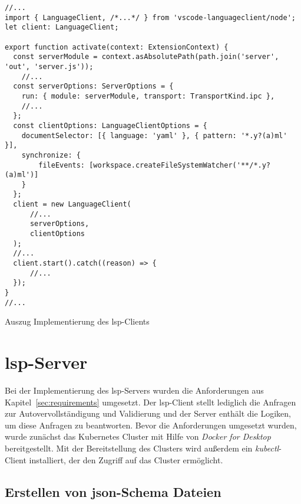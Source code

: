 \begin{listing}[htp]
  \begin{verbatim}
//...
import { LanguageClient, /*...*/ } from 'vscode-languageclient/node';
let client: LanguageClient;
      
export function activate(context: ExtensionContext) {
  const serverModule = context.asAbsolutePath(path.join('server', 'out', 'server.js'));
    //...
  const serverOptions: ServerOptions = {
    run: { module: serverModule, transport: TransportKind.ipc },
    //...
  };
  const clientOptions: LanguageClientOptions = {
    documentSelector: [{ language: 'yaml' }, { pattern: '*.y?(a)ml' }],
    synchronize: {
        fileEvents: [workspace.createFileSystemWatcher('**/*.y?(a)ml')]
    }
  };
  client = new LanguageClient(
      //...
      serverOptions,
      clientOptions
  );
  //...
  client.start().catch((reason) => {
      //...
  });
}
//...
      \end{verbatim}
  \caption{Auszug Implementierung des \acs{lsp}-Clients}
  \label{lst:client-code}
\end{listing}

\section{\acs{lsp}-Server}

Bei der Implementierung des \ac{lsp}-Servers wurden die Anforderungen aus Kapitel~\ref{sec:requirements} umgesetzt.
Der \acs{lsp}-Client stellt lediglich die Anfragen zur Autovervollständigung und Validierung und der Server enthält die Logiken,
um diese Anfragen zu beantworten.
Bevor die Anforderungen umgesetzt wurden, wurde zunächst das Kubernetes Cluster
mit Hilfe von \textit{Docker for Desktop} bereitgestellt. Mit der Bereitstellung des Clusters wird außerdem
ein \textit{kubectl}-Client installiert, der den Zugriff auf das Cluster ermöglicht.

\subsection{Erstellen von \acs{json}-Schema Dateien}

